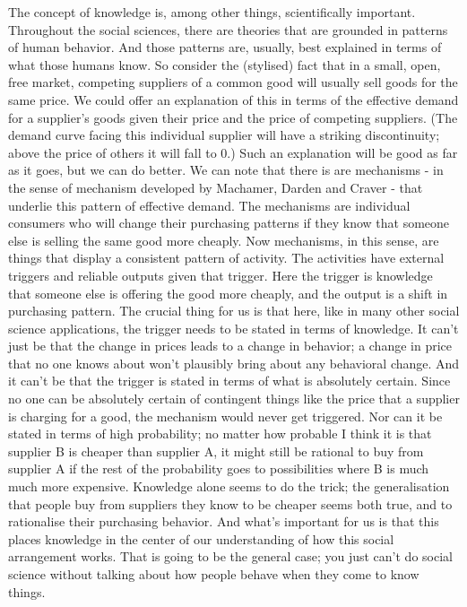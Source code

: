 \documentclass[
  11pt,
]{book}
\begin{document}
The concept of knowledge is, among other things, scientifically important. Throughout the social sciences, there are theories that are grounded in patterns of human behavior. And those patterns are, usually, best explained in terms of what those humans know. So consider the (stylised) fact that in a small, open, free market, competing suppliers of a common good will usually sell goods for the same price. We could offer an explanation of this in terms of the effective demand for a supplier's goods given their price and the price of competing suppliers. (The demand curve facing this individual supplier will have a striking discontinuity; above the price of others it will fall to 0.) Such an explanation will be good as far as it goes, but we can do better. We can note that there is are mechanisms - in the sense of mechanism developed by Machamer, Darden and Craver \citeyearpar{MachamerEtAl2000} - that underlie this pattern of effective demand. The mechanisms are individual consumers who will change their purchasing patterns if they know that someone else is selling the same good more cheaply. Now mechanisms, in this sense, are things that display a consistent pattern of activity. The activities have external triggers and reliable outputs given that trigger. Here the trigger is knowledge that someone else is offering the good more cheaply, and the output is a shift in purchasing pattern. The crucial thing for us is that here, like in many other social science applications, the trigger needs to be stated in terms of knowledge. It can't just be that the change in prices leads to a change in behavior; a change in price that no one knows about won't plausibly bring about any behavioral change. And it can't be that the trigger is stated in terms of what is absolutely certain. Since no one can be absolutely certain of contingent things like the price that a supplier is charging for a good, the mechanism would never get triggered. Nor can it be stated in terms of high probability; no matter how probable I think it is that supplier B is cheaper than supplier A, it might still be rational to buy from supplier A if the rest of the probability goes to possibilities where B is much much more expensive. Knowledge alone seems to do the trick; the generalisation that people buy from suppliers they know to be cheaper seems both true, and to rationalise their purchasing behavior. And what's important for us is that this places knowledge in the center of our understanding of how this social arrangement works. That is going to be the general case; you just can't do social science without talking about how people behave when they come to know things.
\end{document}
